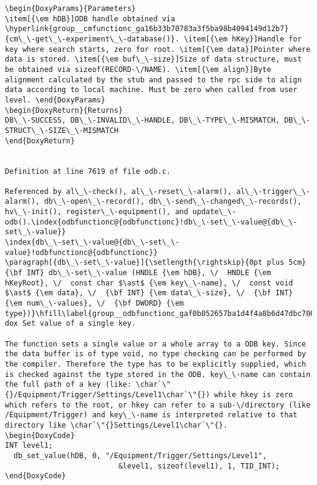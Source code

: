 \begin{DoxyItemize}
\begin{DoxyCode}
\begin{verbatim}
\begin{DoxyParams}{Parameters}
\item[{\em hDB}]ODB handle obtained via \hyperlink{group__cmfunctionc_ga16b33b70783a3f5ba98b4094149d12b7}{cm\_\-get\_\-experiment\_\-database()}. \item[{\em hKey}]Handle for key where search starts, zero for root. \item[{\em data}]Pointer where data is stored. \item[{\em buf\_\-size}]Size of data structure, must be obtained via sizeof(RECORD-\/NAME). \item[{\em align}]Byte alignment calculated by the stub and passed to the rpc side to align data according to local machine. Must be zero when called from user level. \end{DoxyParams}
\begin{DoxyReturn}{Returns}
DB\_\-SUCCESS, DB\_\-INVALID\_\-HANDLE, DB\_\-TYPE\_\-MISMATCH, DB\_\-STRUCT\_\-SIZE\_\-MISMATCH 
\end{DoxyReturn}


Definition at line 7619 of file odb.c.

Referenced by al\_\-check(), al\_\-reset\_\-alarm(), al\_\-trigger\_\-alarm(), db\_\-open\_\-record(), db\_\-send\_\-changed\_\-records(), hv\_\-init(), register\_\-equipment(), and update\_\-odb().\index{odbfunctionc@{odbfunctionc}!db\_\-set\_\-value@{db\_\-set\_\-value}}
\index{db\_\-set\_\-value@{db\_\-set\_\-value}!odbfunctionc@{odbfunctionc}}
\paragraph[{db\_\-set\_\-value}]{\setlength{\rightskip}{0pt plus 5cm}{\bf INT} db\_\-set\_\-value (HNDLE {\em hDB}, \/  HNDLE {\em hKeyRoot}, \/  const char $\ast$ {\em key\_\-name}, \/  const void $\ast$ {\em data}, \/  {\bf INT} {\em data\_\-size}, \/  {\bf INT} {\em num\_\-values}, \/  {\bf DWORD} {\em type})}\hfill\label{group__odbfunctionc_gaf0b052657ba1d4f4a8b6d47dbc70008c}
dox Set value of a single key.

The function sets a single value or a whole array to a ODB key. Since the data buffer is of type void, no type checking can be performed by the compiler. Therefore the type has to be explicitly supplied, which is checked against the type stored in the ODB. key\_\-name can contain the full path of a key (like: \char`\"{}/Equipment/Trigger/Settings/Level1\char`\"{}) while hkey is zero which refers to the root, or hkey can refer to a sub-\/directory (like /Equipment/Trigger) and key\_\-name is interpreted relative to that directory like \char`\"{}Settings/Level1\char`\"{}. 
\begin{DoxyCode}
INT level1;
  db_set_value(hDB, 0, "/Equipment/Trigger/Settings/Level1",
                          &level1, sizeof(level1), 1, TID_INT);
\end{DoxyCode}
 

\end{verbatim}
\end{DoxyCode}
\end{DoxyItemize}
